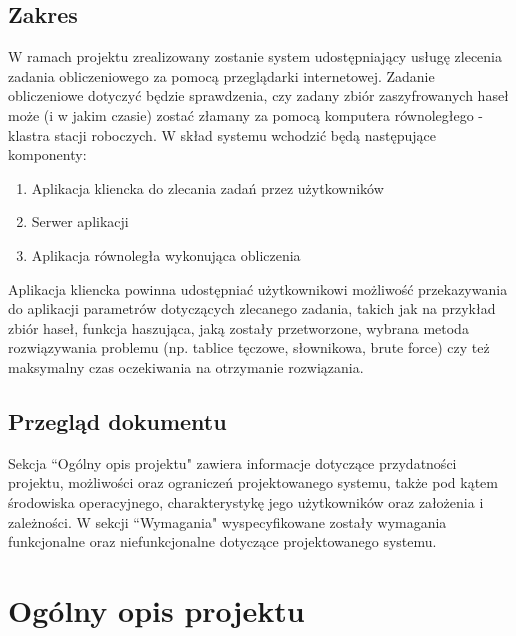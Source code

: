 \documentclass[a4paper,10pt]{article}
\begin{document}
\subsection{Zakres}
W ramach projektu zrealizowany zostanie system udostępniający usługę zlecenia zadania obliczeniowego za pomocą przeglądarki internetowej. Zadanie obliczeniowe dotyczyć będzie sprawdzenia, czy zadany zbiór zaszyfrowanych haseł może (i w jakim czasie) zostać złamany za pomocą komputera równoległego - klastra stacji roboczych. W skład systemu wchodzić będą następujące komponenty:
\begin{enumerate}
\item Aplikacja kliencka do zlecania zadań przez użytkowników
\item Serwer aplikacji
\item Aplikacja równoległa wykonująca obliczenia
\end{enumerate}
Aplikacja kliencka powinna udostępniać użytkownikowi możliwość przekazywania do aplikacji parametrów dotyczących zlecanego zadania, takich jak na przykład zbiór haseł, funkcja haszująca, jaką zostały przetworzone, wybrana metoda rozwiązywania problemu (np. tablice tęczowe, słownikowa, brute force) czy też maksymalny czas oczekiwania na otrzymanie rozwiązania.
\subsection{Przegląd dokumentu}
Sekcja ``Ogólny opis projektu" zawiera informacje dotyczące przydatności projektu, możliwości oraz ograniczeń projektowanego systemu, także pod kątem środowiska operacyjnego, charakterystykę jego użytkowników oraz założenia i zależności.
W sekcji ``Wymagania" wyspecyfikowane zostały wymagania funkcjonalne oraz niefunkcjonalne dotyczące projektowanego systemu.
\section{Ogólny opis projektu}
\end{document}
